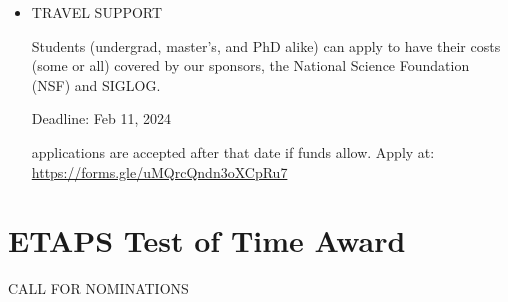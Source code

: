 \documentclass[prodmode,acmtecs]{acmsmall} %
\begin{document}
\begin{itemize}
\item  TRAVEL SUPPORT 
 
  Students (undergrad, master's, and PhD alike) can apply to have their costs (some or all) covered by our sponsors, the National Science Foundation (NSF) and SIGLOG.  
 
Deadline: Feb 11, 2024 
 
  applications are accepted after that date if funds allow. Apply at: \href{https://forms.gle/uMQrcQndn3oXCpRu7}{https://forms.gle/uMQrcQndn3oXCpRu7} 
 
\end{itemize}\section{ETAPS Test of Time Award}\label{ETAPSTestofTimeAward}CALL FOR NOMINATIONS 
\end{document}

